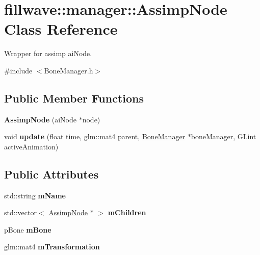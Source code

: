 \hypertarget{classfillwave_1_1manager_1_1AssimpNode}{}\section{fillwave\+:\+:manager\+:\+:Assimp\+Node Class Reference}
\label{classfillwave_1_1manager_1_1AssimpNode}


Wrapper for assimp ai\+Node.  




{\ttfamily \#include $<$Bone\+Manager.\+h$>$}

\subsection*{Public Member Functions}
\begin{DoxyCompactItemize}
\item 
\hypertarget{classfillwave_1_1manager_1_1AssimpNode_a69c38409986149770c75a780d821f26a}{}{\bfseries Assimp\+Node} (ai\+Node $\ast$node)\label{classfillwave_1_1manager_1_1AssimpNode_a69c38409986149770c75a780d821f26a}

\item 
\hypertarget{classfillwave_1_1manager_1_1AssimpNode_af75d5bc1a43057af7d0c8985ad694e6c}{}void {\bfseries update} (float time, glm\+::mat4 parent, \hyperlink{classfillwave_1_1manager_1_1BoneManager}{Bone\+Manager} $\ast$bone\+Manager, G\+Lint active\+Animation)\label{classfillwave_1_1manager_1_1AssimpNode_af75d5bc1a43057af7d0c8985ad694e6c}

\end{DoxyCompactItemize}
\subsection*{Public Attributes}
\begin{DoxyCompactItemize}
\item 
\hypertarget{classfillwave_1_1manager_1_1AssimpNode_a1244970148c3af3322e1cac6406ce005}{}std\+::string {\bfseries m\+Name}\label{classfillwave_1_1manager_1_1AssimpNode_a1244970148c3af3322e1cac6406ce005}

\item 
\hypertarget{classfillwave_1_1manager_1_1AssimpNode_a6d0b9596029f6e918358cf4c53b65ff3}{}std\+::vector$<$ \hyperlink{classfillwave_1_1manager_1_1AssimpNode}{Assimp\+Node} $\ast$ $>$ {\bfseries m\+Children}\label{classfillwave_1_1manager_1_1AssimpNode_a6d0b9596029f6e918358cf4c53b65ff3}

\item 
\hypertarget{classfillwave_1_1manager_1_1AssimpNode_ad387fd56b80894a4b1a3b90d7b5c8dc6}{}p\+Bone {\bfseries m\+Bone}\label{classfillwave_1_1manager_1_1AssimpNode_ad387fd56b80894a4b1a3b90d7b5c8dc6}

\item 
\hypertarget{classfillwave_1_1manager_1_1AssimpNode_a591b44e82cf79b2ab07d65fc778159b4}{}glm\+::mat4 {\bfseries m\+Transformation}\label{classfillwave_1_1manager_1_1AssimpNode_a591b44e82cf79b2ab07d65fc778159b4}

\end{DoxyCompactItemize}


